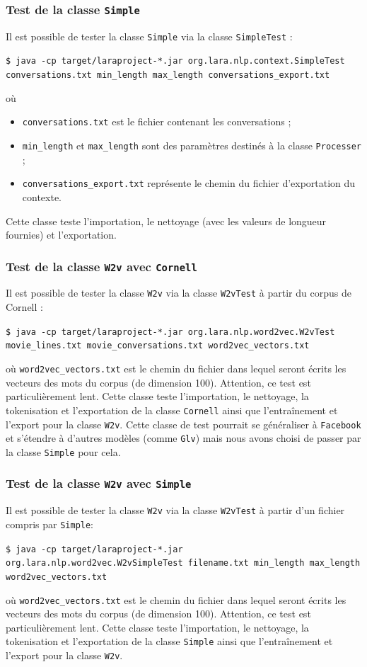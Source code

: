 \documentclass[10pt,a4paper]{article}
\begin{document}
\subsubsection{Test de la classe \texttt{Simple}}
Il est possible de tester la classe \texttt{Simple} via la classe \texttt{SimpleTest} :
\begin{center}
	\texttt{\$ java -cp target/laraproject-*.jar org.lara.nlp.context.SimpleTest conversations.txt min\_length max\_length conversations\_export.txt}
\end{center}
où
\begin{itemize}
	\item \texttt{conversations.txt} est le fichier contenant les conversations ;
	\item \texttt{min\_length} et \texttt{max\_length} sont des paramètres destinés à la classe \texttt{Processer} ;
	\item \texttt{conversations\_export.txt} représente le chemin du fichier d'exportation du contexte.
\end{itemize}
Cette classe teste l'importation, le nettoyage (avec les valeurs de longueur fournies) et l'exportation.
\subsubsection{Test de la classe \texttt{W2v} avec \texttt{Cornell}}
Il est possible de tester la classe \texttt{W2v} via la classe \texttt{W2vTest} à partir du corpus de Cornell :
\begin{center}
	\texttt{\$ java -cp target/laraproject-*.jar org.lara.nlp.word2vec.W2vTest movie\_lines.txt movie\_conversations.txt word2vec\_vectors.txt}
\end{center}
où \texttt{word2vec\_vectors.txt} est le chemin du fichier dans lequel seront écrits les vecteurs des mots du corpus (de dimension 100). Attention, ce test est particulièrement lent. Cette classe teste l'importation, le nettoyage, la tokenisation et l'exportation de la classe \texttt{Cornell} ainsi que l'entraînement et l'export pour la classe \texttt{W2v}. Cette classe de test pourrait se généraliser à \texttt{Facebook} et s'étendre à d'autres modèles (comme \texttt{Glv}) mais nous avons  choisi de passer par la classe \texttt{Simple} pour cela.
\subsubsection{Test de la classe \texttt{W2v} avec \texttt{Simple}}
Il est possible de tester la classe \texttt{W2v} via la classe \texttt{W2vTest} à partir d'un fichier compris par \texttt{Simple}:
\begin{center}
	\texttt{\$ java -cp target/laraproject-*.jar org.lara.nlp.word2vec.W2vSimpleTest filename.txt min\_length max\_length word2vec\_vectors.txt}
\end{center}
où \texttt{word2vec\_vectors.txt} est le chemin du fichier dans lequel seront écrits les vecteurs des mots du corpus (de dimension 100). Attention, ce test est particulièrement lent. Cette classe teste l'importation, le nettoyage, la tokenisation et l'exportation de la classe \texttt{Simple} ainsi que l'entraînement et l'export pour la classe \texttt{W2v}.
\end{document}
